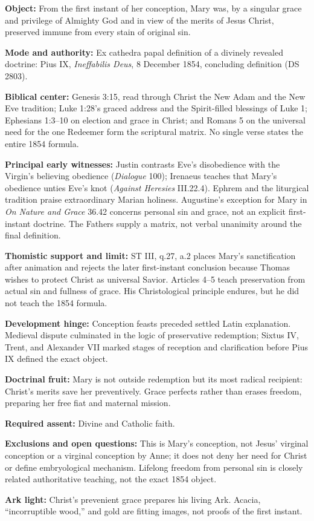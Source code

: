 \begingroup
\small
\begin{studyframe}
\textbf{Object:} From the first instant of her conception, Mary was, by a
singular grace and privilege of Almighty God and in view of the merits of
Jesus Christ, preserved immune from every stain of original sin.\par
\textbf{Mode and authority:} Ex cathedra papal definition of a divinely
revealed doctrine: Pius IX, \emph{Ineffabilis Deus}, 8 December 1854, concluding
definition (DS 2803).\par
\textbf{Biblical center:} Genesis 3:15, read through Christ the New Adam and
the New Eve tradition; Luke 1:28's graced address and the Spirit-filled
blessings of Luke 1; Ephesians 1:3--10 on election and grace in Christ; and
Romans 5 on the universal need for the one Redeemer form the scriptural matrix.
No single verse states the entire 1854 formula.\par
\textbf{Principal early witnesses:} Justin contrasts Eve's disobedience with
the Virgin's believing obedience (\emph{Dialogue} 100); Irenaeus teaches that
Mary's obedience unties Eve's knot (\emph{Against Heresies} III.22.4).
Ephrem and the liturgical tradition praise extraordinary Marian holiness.
Augustine's exception for Mary in \emph{On Nature and Grace} 36.42 concerns
personal sin and grace, not an explicit first-instant doctrine.  The Fathers
supply a matrix, not verbal unanimity around the final definition.\par
\textbf{Thomistic support and limit:} ST III, q.27, a.2 places Mary's
sanctification after animation and rejects the later first-instant conclusion
because Thomas wishes to protect Christ as universal Savior.  Articles 4--5
teach preservation from actual sin and fullness of grace.  His Christological
principle endures, but he did not teach the 1854 formula.\par
\textbf{Development hinge:} Conception feasts preceded settled Latin
explanation.  Medieval dispute culminated in the logic of preservative
redemption; Sixtus IV, Trent, and Alexander VII marked stages of reception and
clarification before Pius IX defined the exact object.\par
\textbf{Doctrinal fruit:} Mary is not outside redemption but its most radical
recipient: Christ's merits save her preventively.  Grace perfects rather than
erases freedom, preparing her free fiat and maternal mission.\par
\textbf{Required assent:} Divine and Catholic faith.\par
\textbf{Exclusions and open questions:} This is Mary's conception, not Jesus'
virginal conception or a virginal conception by Anne; it does not deny her
need for Christ or define embryological mechanism.  Lifelong freedom from
personal sin is closely related authoritative teaching, not the exact 1854
object.\par
\textbf{Ark light:} Christ's prevenient grace prepares his living Ark.
Acacia, ``incorruptible wood,'' and gold are fitting images, not proofs of the
first instant.
\end{studyframe}
\endgroup

